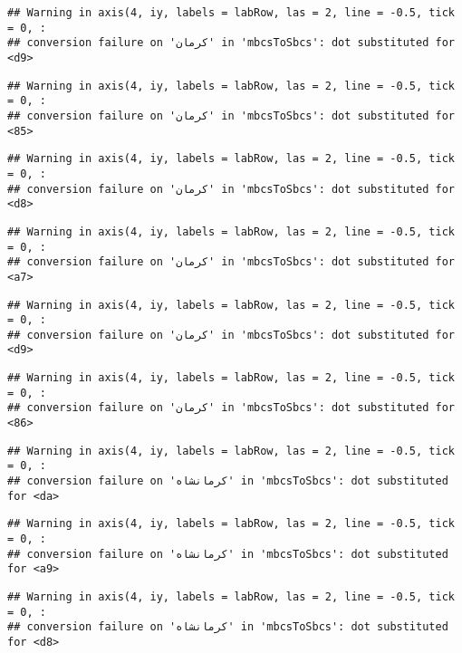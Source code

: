 \documentclass[
]{article}
\begin{document}
\begin{verbatim}
## Warning in axis(4, iy, labels = labRow, las = 2, line = -0.5, tick = 0, :
## conversion failure on 'کرمان' in 'mbcsToSbcs': dot substituted for <d9>
\end{verbatim}

\begin{verbatim}
## Warning in axis(4, iy, labels = labRow, las = 2, line = -0.5, tick = 0, :
## conversion failure on 'کرمان' in 'mbcsToSbcs': dot substituted for <85>
\end{verbatim}

\begin{verbatim}
## Warning in axis(4, iy, labels = labRow, las = 2, line = -0.5, tick = 0, :
## conversion failure on 'کرمان' in 'mbcsToSbcs': dot substituted for <d8>
\end{verbatim}

\begin{verbatim}
## Warning in axis(4, iy, labels = labRow, las = 2, line = -0.5, tick = 0, :
## conversion failure on 'کرمان' in 'mbcsToSbcs': dot substituted for <a7>
\end{verbatim}

\begin{verbatim}
## Warning in axis(4, iy, labels = labRow, las = 2, line = -0.5, tick = 0, :
## conversion failure on 'کرمان' in 'mbcsToSbcs': dot substituted for <d9>
\end{verbatim}

\begin{verbatim}
## Warning in axis(4, iy, labels = labRow, las = 2, line = -0.5, tick = 0, :
## conversion failure on 'کرمان' in 'mbcsToSbcs': dot substituted for <86>
\end{verbatim}

\begin{verbatim}
## Warning in axis(4, iy, labels = labRow, las = 2, line = -0.5, tick = 0, :
## conversion failure on 'کرمانشاه' in 'mbcsToSbcs': dot substituted for <da>
\end{verbatim}

\begin{verbatim}
## Warning in axis(4, iy, labels = labRow, las = 2, line = -0.5, tick = 0, :
## conversion failure on 'کرمانشاه' in 'mbcsToSbcs': dot substituted for <a9>
\end{verbatim}

\begin{verbatim}
## Warning in axis(4, iy, labels = labRow, las = 2, line = -0.5, tick = 0, :
## conversion failure on 'کرمانشاه' in 'mbcsToSbcs': dot substituted for <d8>
\end{verbatim}
\end{document}
